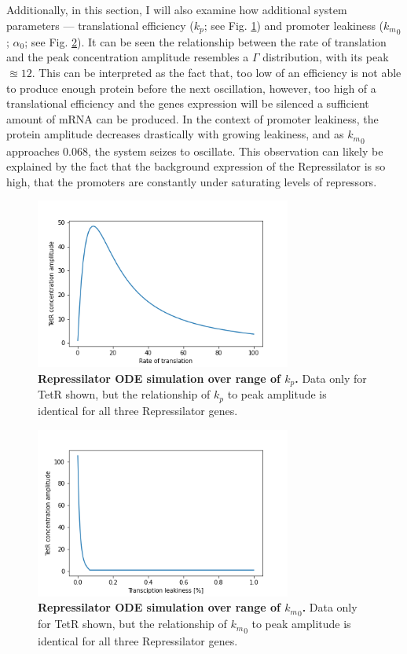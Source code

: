 \documentclass[runningheads,a4paper]{llncs}
\begin{document}
Additionally, in this section, I will also examine how additional system parameters --- translational efficiency ($k_{p}$; see Fig. \ref{fig:fig10}) and promoter leakiness (${k_{m}}_{0}$; $\alpha_{0}$; see Fig. \ref{fig:fig11}). It can be seen the relationship between the rate of translation and the peak concentration amplitude resembles a $\Gamma$ distribution, with its peak $\approxeq 12$. This can be interpreted as the fact that, too low of an efficiency is not able to produce enough protein before the next oscillation, however, too high of a translational efficiency and the genes expression will be silenced a sufficient amount of mRNA can be produced. In the context of promoter leakiness, the protein amplitude decreases drastically with growing leakiness, and as ${k_{m}}_{0}$ approaches $0.068$, the system seizes to oscillate. This observation can likely be explained by the fact that the background expression of the Repressilator is so high, that the promoters are constantly under saturating levels of repressors.

\begin{figure}
    \singlespacing
    \centering
    \includegraphics[width=0.75\textwidth]{suplementary_information_and_code/Task3_figure4.png}
    \caption{\textbf{Repressilator ODE simulation over range of $k_{p}$.} Data only for TetR shown, but the relationship of $k_{p}$ to peak amplitude is identical for all three Repressilator genes.}
    \label{fig:fig10}
\end{figure}

\begin{figure}
    \singlespacing
    \centering
    \includegraphics[width=0.75\textwidth]{suplementary_information_and_code/Task3_figure5.png}
    \caption{\textbf{Repressilator ODE simulation over range of ${k_{m}}_{0}$.} Data only for TetR shown, but the relationship of ${k_{m}}_{0}$ to peak amplitude is identical for all three Repressilator genes.}
    \label{fig:fig11}
\end{figure}
\end{document}
